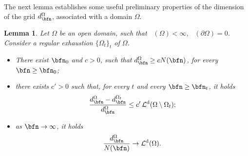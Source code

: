 \documentclass{amsart}
\newtheorem{lem}[thm]{Lemma}
\DeclareMathOperator{\Ld}{\mathcal{L}^d}
\begin{document}
The next lemma establishes some useful preliminary properties of the dimension of the grid $d_\bfn^{\Omega}$, associated with a domain $\Omega$.
\begin{lem}\label{dimensions}
    Let $\Omega$ be an open domain, such that $\Ld(\Omega)<\infty$, $\Ld(\partial\Omega)=0$. Consider a regular exhaustion $\{\Omega_t\}_t$ of $\Omega$.\\
    \begin{itemize}
        \item[(i)]\label{dim_item_1} There exist $\bfn_0$ and $c>0$, such that $d_\bfn^{\Omega}\geq cN(\bfn)$, for every $\bfn\geq\bfn_0$;\\
        \item[(ii)]\label{dim_item_2} there exists $c'>0$ such that, for every $t$ and every $\bfn\geq\bfn_t$, it holds 
        \begin{equation*}
            \frac{d_\bfn^{\Omega}-d_\bfn^{\Omega_t}}{d_\bfn^{\Omega}}\leq c'\Ld(\Omega\setminus\Omega_t);
        \end{equation*}
        \item[(iii)]\label{dim_item_3} as $\bfn\to\infty$, it holds
        \begin{equation*}
            \frac{d_\bfn^{\Omega}}{N(\bfn)}\to\Ld(\Omega).
        \end{equation*}
    \end{itemize}
\end{lem}
\end{document}
